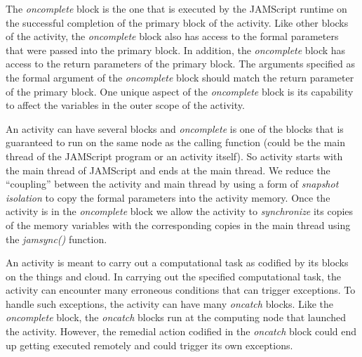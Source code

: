 \documentclass[11pt]{article}
\begin{document}
The {\em oncomplete} block is the one that is executed by the JAMScript runtime
on the successful completion of the primary block of the activity. Like other
blocks of the activity, the {\em oncomplete} block also has access to the formal
parameters that were passed into the primary block. In addition, the {\em
oncomplete} block has access to the return parameters of the primary block. The
arguments specified as the formal argument of the {\em oncomplete} block should
match the return parameter of the primary block. One unique aspect of the {\em
oncomplete} block is its capability to affect the variables in the outer scope
of the activity.


An activity can have several blocks and {\em oncomplete} is one of the blocks
that is guaranteed to run on the same node as the calling function (could be the
main thread of the JAMScript program or an activity itself). So activity starts
with the main thread of JAMScript and ends at the main thread. We reduce the
``coupling'' between the activity and main thread by using a form of {\em
snapshot isolation} to copy the formal parameters into the activity memory. Once
the activity is in the {\em oncomplete} block we allow the activity to {\em
synchronize} its copies of the memory variables with the corresponding copies in
the main thread using the {\em jamsync()} function.



An activity is meant to carry out a computational task as codified by its blocks
on the things and cloud. In carrying out the specified computational task, the
activity can encounter many erroneous conditions that can trigger exceptions. To
handle such exceptions, the activity can have many {\em oncatch} blocks. Like
the {\em oncomplete} block, the {\em oncatch} blocks run at the computing node
that launched the activity. However, the remedial action codified in the {\em
oncatch} block could end up getting executed remotely and could trigger its own
exceptions.




\medskip
\end{document}
